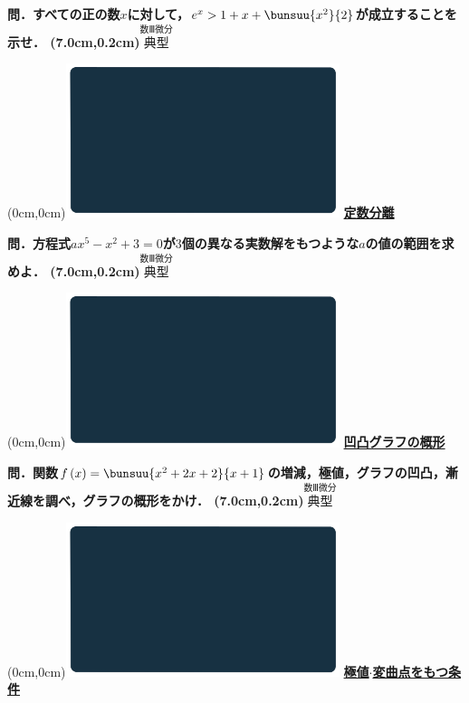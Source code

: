 \documentclass[10pt,
fleqn,
dvipdfmx,
uplatex
]{jsarticle}
\begin{document}
\LARGE 
\bf\boldmath 問．すべての正の数$x$に対して，$e^x>1+x+\bunsuu{{x^2}}{2}$が成立することを示せ．
\at(7.0cm,0.2cm){\small\color{bradorange}$\overset{\text{数Ⅲ微分}}{\text{典型}}$}


\newpage



\at(0cm,0cm){\includegraphics[width=8cm,bb=0 0 1920 1080]{./youtube/thumbnails/templates/smart_background/数III微分.jpeg}}
{\color{orange}\bf\boldmath\huge\underline{定数分離}}\vspace{0.3zw}

\LARGE 
\bf\boldmath 問．方程式$ax^5-x^2+3=0$が$3$個の異なる実数解をもつような$a$の値の範囲を求めよ．
\at(7.0cm,0.2cm){\small\color{bradorange}$\overset{\text{数Ⅲ微分}}{\text{典型}}$}


\newpage



\at(0cm,0cm){\includegraphics[width=8cm,bb=0 0 1920 1080]{./youtube/thumbnails/templates/smart_background/数III微分.jpeg}}
{\color{orange}\bf\boldmath\huge\underline{凹凸グラフの概形}}\vspace{0.3zw}

\LARGE 
\bf\boldmath 問．関数$f\left(x\right)=\bunsuu{{x^2+2x+2}}{{x+1}}$の増減，極値，グラフの凹凸，漸近線を調べ，グラフの概形をかけ．
\at(7.0cm,0.2cm){\small\color{bradorange}$\overset{\text{数Ⅲ微分}}{\text{典型}}$}


\newpage



\at(0cm,0cm){\includegraphics[width=8cm,bb=0 0 1920 1080]{./youtube/thumbnails/templates/smart_background/数III微分.jpeg}}
{\color{orange}\bf\boldmath\LARGE\underline{極値$\cdot$変曲点をもつ条件}}\vspace{0.3zw}
\end{document}
